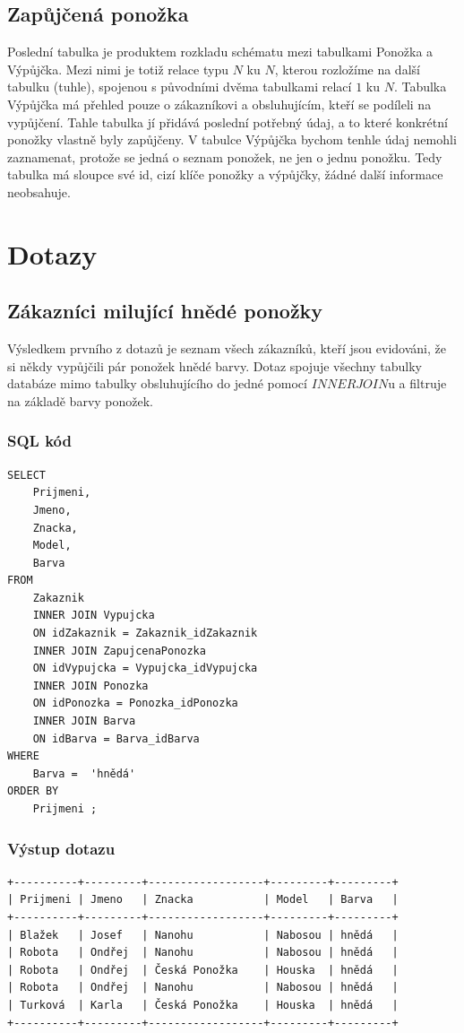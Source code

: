 \documentclass[titlepage]{article}
\begin{document}
\subsection{Zapůjčená ponožka}
Poslední tabulka je produktem rozkladu schématu mezi tabulkami Ponožka a
Výpůjčka. Mezi nimi je totiž relace typu $N$ ku $N$, kterou rozložíme na další
tabulku (tuhle), spojenou s původními dvěma tabulkami relací $1$ ku $N$.
Tabulka Výpůjčka má přehled pouze o zákazníkovi a obsluhujícím, kteří se
podíleli na vypůjčení. Tahle tabulka jí přidává poslední potřebný údaj, a to
které konkrétní ponožky vlastně byly zapůjčeny. V tabulce Výpůjčka bychom
tenhle údaj nemohli zaznamenat, protože se jedná o seznam ponožek, ne jen o
jednu ponožku. Tedy tabulka má sloupce své id, cizí klíče ponožky a výpůjčky,
žádné další informace neobsahuje.

\clearpage
\section{Dotazy}
\subsection{Zákazníci milující hnědé ponožky}
Výsledkem prvního z dotazů je seznam všech zákazníků, kteří jsou evidováni, že
si někdy vypůjčili pár ponožek hnědé barvy. Dotaz spojuje všechny tabulky
databáze mimo tabulky obsluhujícího do jedné pomocí $INNER JOIN$u a filtruje na
základě barvy ponožek.

\subsubsection{SQL kód}
\begin{verbatim}
SELECT 
	Prijmeni, 
	Jmeno, 
	Znacka, 
	Model, 
	Barva
FROM 
	Zakaznik
	INNER JOIN Vypujcka
	ON idZakaznik = Zakaznik_idZakaznik
	INNER JOIN ZapujcenaPonozka
	ON idVypujcka = Vypujcka_idVypujcka
	INNER JOIN Ponozka
	ON idPonozka = Ponozka_idPonozka
	INNER JOIN Barva
	ON idBarva = Barva_idBarva
WHERE 
	Barva =  'hnědá'
ORDER BY
	Prijmeni ;
\end{verbatim}

\subsubsection{Výstup dotazu}
\begin{verbatim}
+----------+---------+------------------+---------+---------+
| Prijmeni | Jmeno   | Znacka           | Model   | Barva   |
+----------+---------+------------------+---------+---------+
| Blažek   | Josef   | Nanohu           | Nabosou | hnědá   |
| Robota   | Ondřej  | Nanohu           | Nabosou | hnědá   |
| Robota   | Ondřej  | Česká Ponožka    | Houska  | hnědá   |
| Robota   | Ondřej  | Nanohu           | Nabosou | hnědá   |
| Turková  | Karla   | Česká Ponožka    | Houska  | hnědá   |
+----------+---------+------------------+---------+---------+
\end{verbatim}
\end{document}
